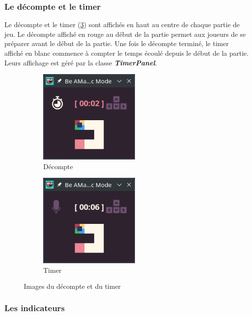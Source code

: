 \newpage
\subsubsection*{Le décompte et le timer}

Le décompte et le timer (\ref{fig:CountdownAndTimer}) sont affichés en haut au centre de chaque partie de jeu. Le décompte affiché en rouge au début de la partie permet aux joueurs de se préparer avant le début de la partie. Une fois le décompte terminé, le timer affiché en blanc commence à compter le temps écoulé depuis le début de la partie. Leurs affichage est géré par la classe \textbf{\textit{TimerPanel}}.

\begin{figure}[!htb]%
    \centering
    \begin{subfigure}{5cm}
        \includegraphics[width=5cm]{ressources/Implementation/Labyrinthe/Vue/CountdownTimer/CountDown.png}%
        \caption{Décompte}
        \label{fig:Countdown}
    \end{subfigure}
    \qquad
    \begin{subfigure}{5cm}
        \includegraphics[width=5cm]{ressources/Implementation/Labyrinthe/Vue/CountdownTimer/Timer.png}%
        \caption{Timer}
        \label{fig:Timer}
    \end{subfigure}
    \caption{Images du décompte et du timer}%
    \label{fig:CountdownAndTimer}
\end{figure}
\FloatBarrier

\subsubsection*{Les indicateurs}

